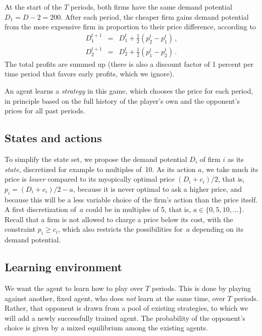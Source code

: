 \documentclass[a4paper,12pt]{article}  %
\theoremstyle{definition}
\begin{document}
At the start of the $T$ periods, both firms have the same
demand potential $D_1=D-2=200$.
After each period, the cheaper firm gains demand potential
from the more expensive firm in proportion to their price
difference, according to
\begin{equation}
\label{demand}
\begin{array}{rcl}
D_1^{t+1}&=&D_1^t+\frac12({p_{2}^t-p_1^t})\,,
\\[1ex]
D_2^{t+1}&=&D_2^t+\frac12({p_{1}^t-p_2^t})\,.
\end{array}
\end{equation}
The total profits are summed up (there is also a discount
factor of 1 percent per time period that favors early
profits, which we ignore).

An agent learns a \textit{strategy} in this game, which
chooses the price for each period, in principle based on the
full history of the player's own and the opponent's prices
for all past periods.

\subsection{States and actions}

To simplify the state set, we propose the demand potential $D_i$ of
firm $i$ as its \textit{state}, discretized for example to
multiples of~10.
As its action $a$, we take much its price is \textit{lower}
compared to its myopically optimal price $(D_i+c_i)/2$, that
is, $p_i=(D_i+c_i)/2-a$, because it is never optimal to ask
a higher price, and because this will be a less variable
choice of the firm's action than the price itself.
A first discretization of~$a$ could be in multiples of 5,
that is, $a\in\{0,5,10,\ldots\}$.
Recall that a firm is not allowed to charge a price below
its cost, with the constraint $p_i\ge c_i$, which also
restricts the possibilities for~$a$ depending on its demand
potential.

\subsection{Learning environment}
\label{s-env}

We want the agent to learn how to play over $T$ periods.
This is done by playing against another, fixed agent, who
does \textit{not} learn at the same time, over $T$ periods.
Rather, that opponent is drawn from a pool of existing
strategies, to which we will add a newly successfully
trained agent.
The probability of the opponent's choice is given by a mixed
equilibrium among the existing agents.
\end{document}
